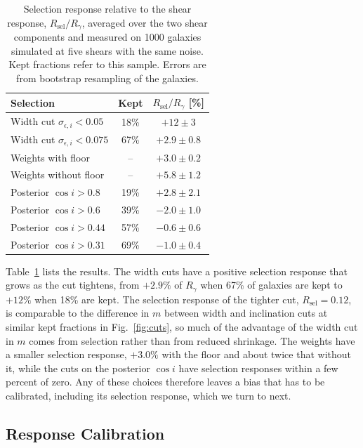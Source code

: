 \begin{table}
\centering
\caption{Selection response relative to the shear response, $R_\mathrm{sel}/R_\gamma$, averaged over the two shear components and measured on 1000 galaxies simulated at five shears with the same noise. Kept fractions refer to this sample. Errors are from bootstrap resampling of the galaxies.}
\label{tab:selection}
\begin{tabular}{lcc}
\toprule
Selection & Kept & $R_\mathrm{sel}/R_\gamma$ [\%] \\
\midrule
Width cut $\sigma_{\epsilon,i} < 0.05$ & 18\% & $+12 \pm 3$ \\
Width cut $\sigma_{\epsilon,i} < 0.075$ & 67\% & $+2.9 \pm 0.8$ \\
Weights with floor & -- & $+3.0 \pm 0.2$ \\
Weights without floor & -- & $+5.8 \pm 1.2$ \\
Posterior $\cos i > 0.8$ & 19\% & $+2.8 \pm 2.1$ \\
Posterior $\cos i > 0.6$ & 39\% & $-2.0 \pm 1.0$ \\
Posterior $\cos i > 0.44$ & 57\% & $-0.6 \pm 0.6$ \\
Posterior $\cos i > 0.31$ & 69\% & $-1.0 \pm 0.4$ \\
\bottomrule
\end{tabular}
\end{table}

Table~\ref{tab:selection} lists the results. The width cuts have a positive selection response that grows as the cut tightens, from $+2.9\%$ of $R_\gamma$ when 67\% of galaxies are kept to $+12\%$ when 18\% are kept. The selection response of the tighter cut, $R_\mathrm{sel} = 0.12$, is comparable to the difference in $m$ between width and inclination cuts at similar kept fractions in Fig.~\ref{fig:cuts}, so much of the advantage of the width cut in $m$ comes from selection rather than from reduced shrinkage. The weights have a smaller selection response, $+3.0\%$ with the floor and about twice that without it, while the cuts on the posterior $\cos i$ have selection responses within a few percent of zero. Any of these choices therefore leaves a bias that has to be calibrated, including its selection response, which we turn to next.

\subsection{Response Calibration}
\label{ssec:response}


